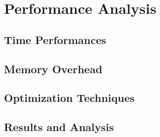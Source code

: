 \chapter{Performance Analysis}
\label{cha:pa}

\lipsum[1]

\section{Time Performances}
\label{sec:pa_time}

\lipsum[1]

\section{Memory Overhead}
\label{sec:pa_memory}

\lipsum[1]

\section{Optimization Techniques}
\label{sec:pa_optimization}

\lipsum[1]

\section{Results and Analysis}
\label{sec:pa_results}

\lipsum[1]